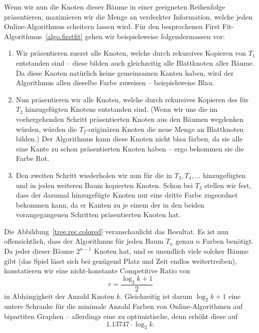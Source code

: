 \documentclass[11pt]{scrreprt} %
\theoremstyle{definition}
\begin{document}
Wenn wir nun die Knoten dieser Bäume in einer geeigneten Reihenfolge präsentieren, maximieren wir die Menge an verdeckter Information, welche jeden Online-Algorithmus scheitern lassen wird. Für den besprochenen First Fit-Algorithmus~\ref{algo.firstfit} gehen wir beispielsweise folgendermassen vor:
\begin{enumerate}
\item Wir präsentieren zuerst alle Knoten, welche durch rekursives Kopieren von $T_1$ entstanden sind -- diese bilden auch gleichzeitig alle Blattknoten aller Bäume. Da diese Knoten natürlich keine gemeinsamen Kanten haben, wird der Algorithmus allen dieselbe Farbe zuweisen -- beispielsweise Blau.

\item Nun präsentieren wir alle Knoten, welche durch rekursives Kopieren des für $T_2$ hinzugefügten Knotens entstanden sind. (Wenn wir uns die im vorhergehenden Schritt präsentierten Knoten aus den Bäumen wegdenken würden, würden die $T_2$-originären Knoten die neue Menge an Blattknoten bilden.) Der Algorithmus kann diese Knoten nicht blau färben, da sie alle eine Kante zu schon präsentierten Knoten haben -- ergo bekommen sie die Farbe Rot.

\item Den zweiten Schritt wiederholen wir nun für die in $T_3, T_4,\dots$ hinzugefügten und in jeden weiteren Baum kopierten Knoten. Schon bei $T_3$ stellen wir fest, dass der dazumal hinzugefügte Knoten nur eine dritte Farbe zugeordnet bekommen kann, da er Kanten zu je einem der in den beiden vorangegangenen Schritten präsentierten Knoten hat.
\end{enumerate}

Die Abbildung~\ref{tree.rec.colored} veranschaulicht das Resultat. Es ist nun offensichtlich, dass der Algorithmus für jeden Baum $T_n$ genau $n$ Farben benötigt. Da jeder dieser Bäume $2^{n-1}$ Knoten hat, und es unendlich viele solcher Bäume gibt (das Spiel lässt sich bei genügend Platz und Zeit endlos weitertreiben), konstatieren wir eine nicht-konstante Competitive Ratio von
\[
	r = \frac {\log_2 k + 1} {2}
\]
in Abhängigkeit der Anzahl Knoten $k$. Gleichzeitig ist darum $\log_2 k+1$ eine untere Schranke für die minimale Anzahl Farben von Online-Algorithmen auf bipartiten Graphen -- allerdings eine zu optimistische, denn \cite{bipartite} erhöht diese auf
\[
	1.13747 \cdot \log_2 k.
\]
\end{document}

